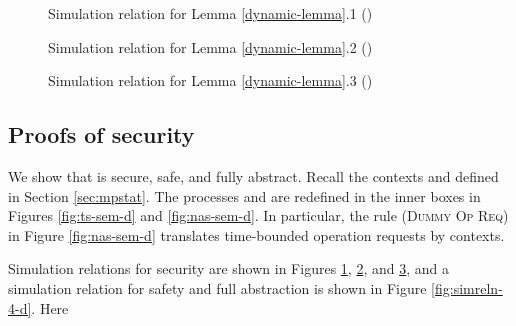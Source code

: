 \documentclass[10pt]{article}
\begin{document}
\begin{figure}
\hspace{-0.5cm}\fbox{\parbox{13.0cm}{\small









}}
\caption{Simulation relation for Lemma \ref{dynamic-lemma}.1 ()}
\label{fig:simreln-1-d}
\end{figure}

\begin{figure}
\hspace{-0.5cm}\fbox{\parbox{13.0cm}{\small









}}
\caption{Simulation relation for Lemma \ref{dynamic-lemma}.2 ()}
\label{fig:simreln-2-d}
\end{figure}




\begin{figure}
\vspace{-0.5cm}
\hspace{-0.5cm}\fbox{\parbox{13.0cm}{\small















}}
\caption{Simulation relation for Lemma \ref{dynamic-lemma}.3 ()}
\label{fig:simreln-3-d}
\end{figure}

\subsection{Proofs of security}

We show that  is secure, safe, and fully abstract. Recall the contexts  and  defined in Section \ref{sec:mpstat}. The processes  and  are redefined in the inner boxes in Figures \ref{fig:ts-sem-d} and \ref{fig:nas-sem-d}. In particular, the rule \textsc{(Dummy Op Req)} in Figure \ref{fig:nas-sem-d} translates time-bounded operation requests by  contexts. 

Simulation relations for security are shown in Figures \ref{fig:simreln-1-d}, \ref{fig:simreln-2-d}, and \ref{fig:simreln-3-d}, and a simulation relation for safety and full abstraction is shown in Figure \ref{fig:simreln-4-d}. Here
\end{document}
